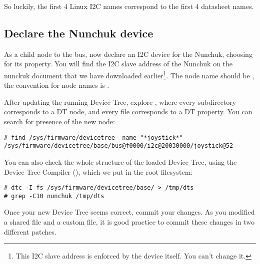 So luckily, the first 4 Linux I2C names correspond to the first 4 datasheet
names.

\subsection{Declare the Nunchuk device}

As a child node to the  bus, now declare an I2C device
for the Nunchuk, choosing  for its 
property. You will find the I2C slave address of the Nunchuk on the
nunckuk document that we have downloaded earlier\footnote{This I2C slave
address is enforced by the device itself. You can't change it.}.
The node name should be , the convention for node
names is .

After updating the running Device Tree, explore
, where every subdirectory corresponds to
a DT node, and every file corresponds to a DT property. You can search
for presence of the new  node:

{\small
\begin{verbatim}
# find /sys/firmware/devicetree -name "*joystick*"
/sys/firmware/devicetree/base/bus@f0000/i2c@20030000/joystick@52
\end{verbatim}
}

You can also check the whole structure of the loaded Device Tree, using
the Device Tree Compiler (), which we put in the root
filesystem:
\begin{verbatim}
# dtc -I fs /sys/firmware/devicetree/base/ > /tmp/dts
# grep -C10 nunchuk /tmp/dts
\end{verbatim}

Once your new Device Tree seems correct, commit your changes. As you
modified a shared file and a custom file, it is good practice to commit
these changes in two different patches.
